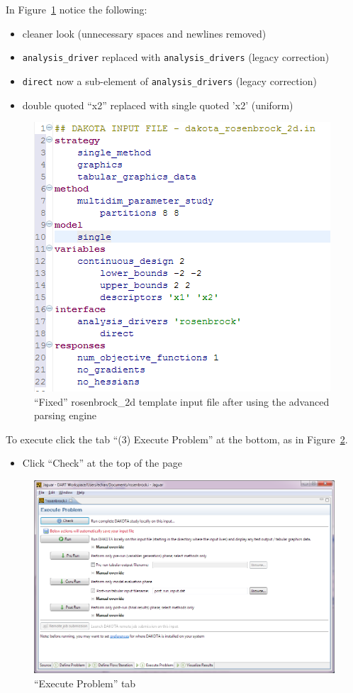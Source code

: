 In Figure~\ref{fig:input:3fixed} notice the following:
\begin{itemize}
\item cleaner look (unnecessary spaces and newlines removed)
\item \texttt{analysis\_driver} replaced with \texttt{analysis\_drivers} (legacy correction)
\item \texttt{direct} now a sub-element of \texttt{analysis\_drivers} (legacy correction)
\item double quoted ``x2'' replaced with single quoted 'x2' (uniform)
\end{itemize}
\begin{figure}[htbp]
  \centering
  \includegraphics[scale=0.6]{images/3fixed}
  \caption{``Fixed'' rosenbrock\_2d template input file after using the advanced parsing engine}
  \label{fig:input:3fixed}
\end{figure}      

 
To execute click the tab ``(3) Execute Problem'' at the bottom, as in Figure~\ref{fig:input:4ExecuteProblem}. 
\begin{itemize}
\item Click ``Check'' at the top of the page
\end{itemize}
\begin{figure}[htbp]
  \centering
  \includegraphics[scale=0.6]{images/4ExecuteProblem}
  \caption{``Execute Problem'' tab}
  \label{fig:input:4ExecuteProblem}
\end{figure}


